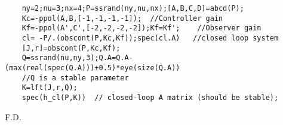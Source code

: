 \begin{examples}
  \begin{Verbatim}
    ny=2;nu=3;nx=4;P=ssrand(ny,nu,nx);[A,B,C,D]=abcd(P);
    Kc=-ppol(A,B,[-1,-1,-1,-1]);  //Controller gain
    Kf=-ppol(A',C',[-2,-2,-2,-2]);Kf=Kf';    //Observer gain
    cl= -P/.(obscont(P,Kc,Kf));spec(cl.A)   //closed loop system
    [J,r]=obscont(P,Kc,Kf);
    Q=ssrand(nu,ny,3);Q.A=Q.A-(max(real(spec(Q.A)))+0.5)*eye(size(Q.A))
    //Q is a stable parameter
    K=lft(J,r,Q);
    spec(h_cl(P,K))  // closed-loop A matrix (should be stable);
  \end{Verbatim}
\end{examples}
\begin{manseealso}
            
\end{manseealso}
\begin{authors}
  F.D.
\end{authors}
